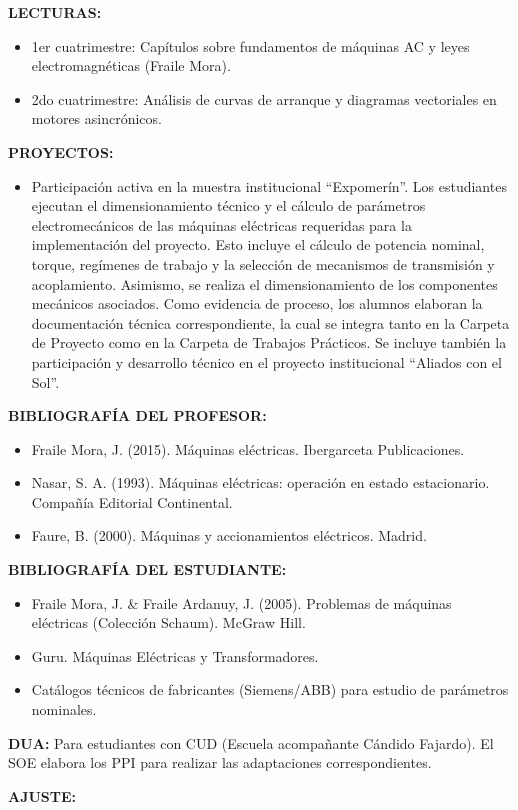 \documentclass[a4paper,12pt]{article}
\begin{document}
\vspace{0.5cm}

\raggedright
\textbf{LECTURAS:}
\begin{itemize}[leftmargin=*, nosep]
  \item 1er cuatrimestre: Capítulos sobre fundamentos de máquinas AC
    y leyes electromagnéticas (Fraile Mora).
  \item 2do cuatrimestre: Análisis de curvas de arranque y diagramas
    vectoriales en motores asincrónicos.
\end{itemize}

\textbf{PROYECTOS:}
\begin{itemize}[leftmargin=*, nosep]
  \item Participación activa en la muestra institucional
    ``Expomerín''. Los estudiantes ejecutan el dimensionamiento
    técnico y el cálculo de parámetros electromecánicos de las
    máquinas eléctricas requeridas para la implementación del
    proyecto. Esto incluye el cálculo de potencia nominal, torque,
    regímenes de trabajo y la selección de mecanismos de transmisión
    y acoplamiento. Asimismo, se realiza el dimensionamiento de los
    componentes mecánicos asociados. Como evidencia de proceso, los
    alumnos elaboran la documentación técnica correspondiente, la
    cual se integra tanto en la Carpeta de Proyecto como en la
    Carpeta de Trabajos Prácticos. Se incluye también la
    participación y desarrollo técnico en el proyecto institucional
    ``Aliados con el Sol''.
\end{itemize}

\textbf{BIBLIOGRAFÍA DEL PROFESOR:}
\begin{itemize}[leftmargin=*, nosep]
  \item Fraile Mora, J. (2015). Máquinas eléctricas. Ibergarceta Publicaciones.
  \item Nasar, S. A. (1993). Máquinas eléctricas: operación en estado
    estacionario. Compañía Editorial Continental.
  \item Faure, B. (2000). Máquinas y accionamientos eléctricos. Madrid.
\end{itemize}

\textbf{BIBLIOGRAFÍA DEL ESTUDIANTE:}
\begin{itemize}[leftmargin=*, nosep]
  \item Fraile Mora, J. \& Fraile Ardanuy, J. (2005). Problemas de
    máquinas eléctricas (Colección Schaum). McGraw Hill.
  \item Guru. Máquinas Eléctricas y Transformadores.
  \item Catálogos técnicos de fabricantes (Siemens/ABB) para estudio
    de parámetros nominales.
\end{itemize}

\textbf{DUA:}
Para estudiantes con CUD (Escuela acompañante Cándido Fajardo). El
SOE elabora los PPI para realizar las adaptaciones correspondientes.

\textbf{AJUSTE:}\\
\noindent\makebox[\linewidth]{\dotfill}\\
\end{document}
